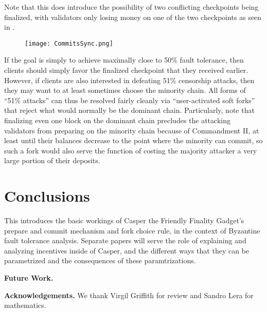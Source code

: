 \documentclass[12pt, final]{article}
\begin{document}
Note that this does introduce the possibility of two conflicting checkpoints being finalized, with validators only losing money on one of the two checkpoints as seen in .

\begin{figure}[h!tb]
\centering
\texttt{[image: CommitsSync.png]}
\caption{}
\label{fig:commitsync}
\end{figure}

If the goal is simply to achieve maximally close to 50\% fault tolerance, then clients should simply favor the finalized checkpoint that they received earlier. However, if clients are also interested in defeating 51\% censorship attacks, then they may want to at least sometimes choose the minority chain. All forms of ``51\% attacks'' can thus be resolved fairly cleanly via ``user-activated soft forks'' that reject what would normally be the dominant chain. Particularly, note that finalizing even one block on the dominant chain precludes the attacking validators from preparing on the minority chain because of Commandment II, at least until their balances decrease to the point where the minority can commit, so such a fork would also serve the function of costing the majority attacker a very large portion of their deposits.

\section{Conclusions}

This introduces the basic workings of Casper the Friendly Finality Gadget's prepare and commit mechanism and fork choice rule, in the context of Byzantine fault tolerance analysis. Separate papers will serve the role of explaining and analyzing incentives inside of Casper, and the different ways that they can be parametrized and the consequences of these paramtrizations.


\textbf{Future Work.} 

\textbf{Acknowledgements.}  We thank Virgil Griffith for review and Sandro Lera for mathematics.







\end{document}
